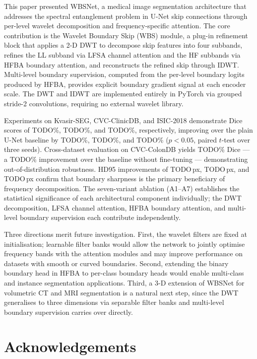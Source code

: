 \documentclass[journal]{IEEEtran}
\begin{document}
This paper presented WBSNet, a medical image segmentation architecture that
addresses the spectral entanglement problem in U-Net skip connections through
per-level wavelet decomposition and frequency-specific attention.
The core contribution is the Wavelet Boundary Skip (WBS) module, a plug-in
refinement block that applies a 2-D DWT to decompose skip features into four
subbands, refines the LL subband via LFSA channel attention and the HF
subbands via HFBA boundary attention, and reconstructs the refined skip
through IDWT.
Multi-level boundary supervision, computed from the per-level boundary logits
produced by HFBA, provides explicit boundary gradient signal at each encoder
scale.
The DWT and IDWT are implemented entirely in PyTorch via grouped stride-2
convolutions, requiring no external wavelet library.

Experiments on Kvasir-SEG, CVC-ClinicDB, and ISIC-2018 demonstrate Dice
scores of TODO\%, TODO\%, and TODO\%, respectively, improving over the plain
U-Net baseline by TODO\%, TODO\%, and TODO\% ($p < 0.05$, paired $t$-test
over three seeds).
Cross-dataset evaluation on CVC-ColonDB yields TODO\% Dice --- a TODO\%
improvement over the baseline without fine-tuning --- demonstrating
out-of-distribution robustness.
HD95 improvements of TODO\,px, TODO\,px, and TODO\,px confirm that
boundary sharpness is the primary beneficiary of frequency decomposition.
The seven-variant ablation (A1--A7) establishes the statistical significance
of each architectural component individually; the DWT decomposition, LFSA
channel attention, HFBA boundary attention, and multi-level boundary
supervision each contribute independently.

Three directions merit future investigation.
First, the wavelet filters are fixed at initialisation; learnable filter banks
would allow the network to jointly optimise frequency bands with the attention
modules and may improve performance on datasets with smooth or curved
boundaries.
Second, extending the binary boundary head in HFBA to per-class boundary heads
would enable multi-class and instance segmentation applications.
Third, a 3-D extension of WBSNet for volumetric CT and MRI segmentation is a
natural next step, since the DWT generalises to three dimensions via separable
filter banks and multi-level boundary supervision carries over directly.


\section*{Acknowledgements}



\end{document}
